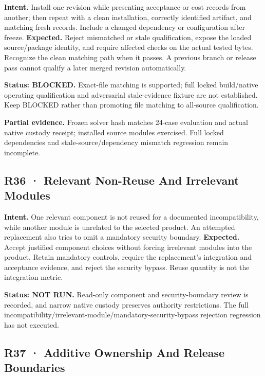 \documentclass[10pt,letterpaper]{article}
\begin{document}
\textbf{Intent.} Install one revision while presenting acceptance or
cost records from another; then repeat with a clean installation,
correctly identified artifact, and matching fresh records. Include a
changed dependency or configuration after freeze. \textbf{Expected.}
Reject mismatched or stale qualification, expose the loaded
source/package identity, and require affected checks on the actual
tested bytes. Recognize the clean matching path when it passes. A
previous branch or release pass cannot qualify a later merged revision
automatically.

\textbf{Status: BLOCKED.} Exact-file matching is supported; full locked
build/native operating qualification and adversarial stale-evidence
fixture are not established. Keep BLOCKED rather than promoting file
matching to all-source qualification.

\textbf{Partial evidence.} Frozen solver hash matches 24-case evaluation
and actual native custody receipt; installed source modules exercised.
Full locked dependencies and stale-source/dependency mismatch regression
remain incomplete.

\hypertarget{r36-relevant-non-reuse-and-irrelevant-modules}{%
\subsection{R36 · Relevant Non-Reuse And Irrelevant
Modules}\label{r36-relevant-non-reuse-and-irrelevant-modules}}

\textbf{Intent.} One relevant component is not reused for a documented
incompatibility, while another module is unrelated to the selected
product. An attempted replacement also tries to omit a mandatory
security boundary. \textbf{Expected.} Accept justified component choices
without forcing irrelevant modules into the product. Retain mandatory
controls, require the replacement's integration and acceptance evidence,
and reject the security bypass. Reuse quantity is not the integration
metric.

\textbf{Status: NOT RUN.} Read-only component and security-boundary
review is recorded, and narrow native custody preserves authority
restrictions. The full
incompatibility/irrelevant-module/mandatory-security-bypass rejection
regression has not executed.

\hypertarget{r37-additive-ownership-and-release-boundaries}{%
\subsection{R37 · Additive Ownership And Release
Boundaries}\label{r37-additive-ownership-and-release-boundaries}}
\end{document}
